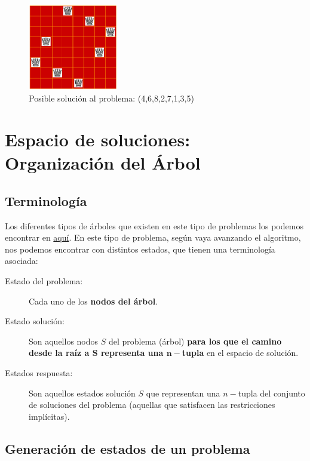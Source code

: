 \documentclass[10pt,a4paper,spanish]{report}
\theoremstyle{definition}
\theoremstyle{remark}
\begin{document}
\begin{figure}[!h]
\centering
\includegraphics[width=0.35\textwidth]{reinas}
\caption{Posible solución al problema: (4,6,8,2,7,1,3,5)}
\end{figure}

\section{\textcolor{electricgreen}Espacio de soluciones:\\ Organización del Árbol}

\subsection{\textcolor{electricgreen}Terminología}

Los diferentes tipos de árboles que existen en este tipo de problemas los podemos encontrar en \hyperref[arboles]{aquí}. En este tipo de problema, según vaya avanzando el algoritmo, nos podemos encontrar con distintos estados, que tienen una terminología asociada:

\begin{description}
    \item [Estado del problema:] Cada uno de los \textbf{\textcolor{electricgreen}{nodos del árbol}}.
    \item [Estado solución:] Son aquellos nodos $S$ del problema (árbol) \textbf{\textcolor{electricgreen}{para los que el camino desde la raíz a $\mathbf{S}$ representa una $\mathbf{n-}$tupla}} en el espacio de solución.
    \item [Estados respuesta:] Son aquellos estados solución $S$ que representan una $n-$tupla del conjunto de soluciones del problema (aquellas que satisfacen las restricciones implícitas).
\end{description}

\subsection{\textcolor{electricgreen}Generación de estados de un problema}
\end{document}
